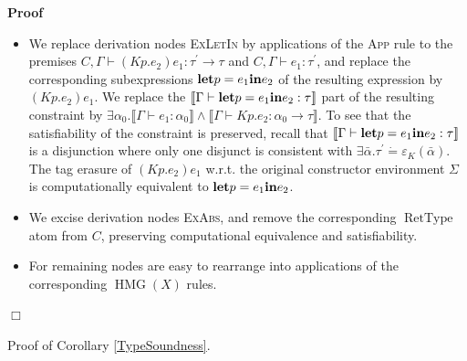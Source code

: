 \documentclass{article}
\newcommand{\tmname}[1]{\textsc{#1}}
\newcommand{\tmop}[1]{\ensuremath{\operatorname{#1}}}
\newcommand{\tmstrong}[1]{\textbf{#1}}
\newenvironment{proof}{\noindent\textbf{Proof\ }}{\hspace*{\fill}$\Box$\medskip}
\begin{document}
\begin{proof}
\begin{itemize}
    \item We replace derivation nodes {\tmname{ExLetIn}} by applications of
    the {\tmname{App}} rule to the premises $C, \Gamma \vdash (K p.e_2) e_1 :
    \tau^{\prime} \rightarrow \tau$ and $C, \Gamma \vdash e_1 :
    \tau^{\prime}$, and replace the corresponding subexpressions
    $\text{{\tmstrong{let}}} p = e_1  \text{{\tmstrong{in}}} e_2$ of the
    resulting expression by $(K p.e_2) e_1$. We replace the $\left\llbracket
    \Gamma \vdash \text{{\tmstrong{let}}} p = e_1  \text{{\tmstrong{in}}} e_2
    : \tau \right\rrbracket$ part of the resulting constraint by $\exists
    \alpha_0 . \llbracket \Gamma \vdash e_1 : \alpha_0 \rrbracket \wedge
    \llbracket \Gamma \vdash K p.e_2 : \alpha_0 \rightarrow \tau \rrbracket$.
    To see that the satisfiability of the constraint is preserved, recall that
    $\left\llbracket \Gamma \vdash \text{{\tmstrong{let}}} p = e_1 
    \text{{\tmstrong{in}}} e_2 : \tau \right\rrbracket$ is a disjunction where
    only one disjunct is consistent with $\exists \bar{\alpha} . \tau^{\prime}
    \dot{=} \varepsilon_K (\bar{\alpha})$. The tag erasure of $(K p.e_2) e_1$
    w.r.t. the original constructor environment $\Sigma$ is computationally
    equivalent to $\text{{\tmstrong{let}}} p = e_1  \text{{\tmstrong{in}}}
    e_2$.
    
    \item We excise derivation nodes {\tmname{ExAbs}}, and remove the
    corresponding $\tmop{RetType}$ atom from $C$, preserving computational
    equivalence and satisfiability.
    
    \item For remaining nodes are easy to rearrange into applications of the
    corresponding $\tmop{HMG} (X)$ rules.
  \end{itemize}
\end{proof}

Proof of Corollary \ref{TypeSoundness}.
\end{document}
